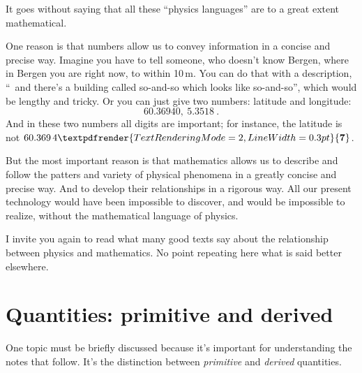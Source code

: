 \documentclass[a4paper,12pt,%
onecolumn,oneside,titlepage,%
british%
]{memoir}
\renewcommand*{\bm}[1]{\textpdfrender{TextRenderingMode=2,LineWidth=0.3pt}{\boldsymbol{#1}}}
\renewcommand*{\|}[1][]{\nonscript\:#1\vert\nonscript\:\mathopen{}}
\begin{document}
\medskip

It goes without saying that all these \enquote{physics languages} are to a great extent mathematical.

One reason is that numbers allow us to convey information in a concise and precise way. Imagine you have to tell someone, who doesn't know
Bergen, where in Bergen you are right now, to within 10\,m. You can do that with a description, \enquote{\textellipsis\ and there's a building called so-and-so which looks like so-and-so\textellipsis}, which would be lengthy and tricky. Or you can just give two numbers: latitude and longitude:
\begin{equation*}
  \num{60.36940},\ \num{5.3518} \ .
\end{equation*}
And in these two numbers all digits are important; for instance, the latitude is not \ensuremath{60.369\,4\bm{7}}.

But the most important reason is that mathematics allows us to describe and follow the patters and variety of physical phenomena in a greatly concise and precise way. And to develop their relationships in a rigorous way.
All our present technology would have been impossible to discover, and would be impossible to realize, without the mathematical language of physics.

I invite you again to read what many good texts say about the relationship between physics and mathematics. No point repeating here what is said better elsewhere.

\section{Quantities: primitive and derived}
\label{sec:primitives}

One topic must be briefly discussed because it's important for understanding the notes that follow. It's the distinction between \emph{primitive} and \emph{derived} quantities.
\end{document}
